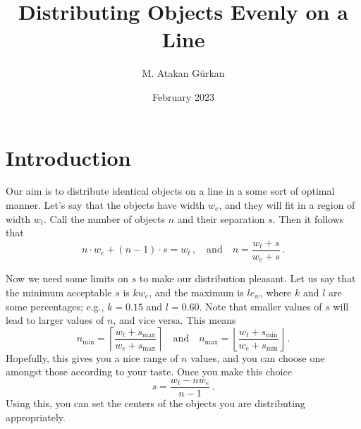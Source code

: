 \documentclass{article}
\title{Distributing Objects Evenly on a Line}
\author{M. Atakan Gürkan}
\date{February 2023}
\begin{document}
\maketitle

\section{Introduction}
Our aim is to distribute identical objects on a line in a some sort of optimal manner. Let's say that the objects have width $w_e$, and they will fit in a region of width $w_t$. Call the number of objects $n$ and their separation $s$. Then it follows that
\[ n\cdot w_e + (n-1)\cdot s = w_t\,, \quad\text{and}\quad
n=\frac{w_t+s}{w_e+s}\,.\]

Now we need some limits on $s$ to make our distribution pleasant. Let us say that the minimum acceptable $s$ is $kw_e$, and the maximum is $le_w$, where $k$ and $l$ are some percentages; e.g., $k=0.15$ and $l=0.60$. Note that smaller values of $s$ will lead to larger values of $n$, and vice versa. This means
\[
n_\text{min} = \left\lceil\frac{w_t+s_\text{max}}{w_e+s_\text{max}} \right\rceil
\quad\text{and}\quad
n_\text{max} = \left\lfloor\frac{w_t+s_\text{min}}{w_e+s_\text{min}} \right\rfloor \,.
\]
Hopefully, this gives you a nice range of $n$ values, and you can choose one amongst those according to your taste. Once you make this choice 
\[ s = \frac{w_t - n w_e}{n-1}\,.\]
Using this, you can set the centers of the objects you are distributing appropriately.
\end{document}

